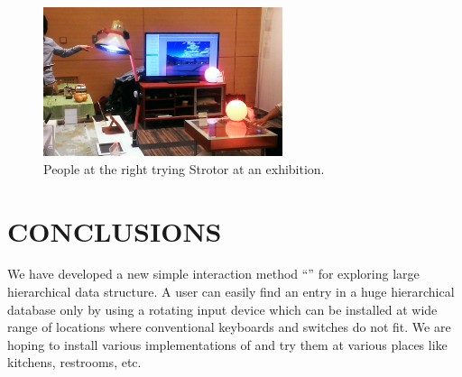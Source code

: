 \documentclass{article}
\begin{document}
\begin{figure}[H]
\centerline{\includegraphics[width=70mm,bb=0 0 527 329]{figures/c520d5dfbd06c532d48d324a7019b00c.png}}
\caption{People at the right trying Strotor at an exhibition.}
\label{exhibition}
\end{figure}


\section*{CONCLUSIONS}

We have developed a new simple interaction method ``{\ST}'' for exploring
large hierarchical data structure.
A {\ST} user can easily find an entry in a huge hierarchical database
only by using a rotating input device which can be installed at
wide range of locations where conventional keyboards and switches do not fit.
We are hoping to install various implementations of {\ST} and try them at
various places like kitchens, restrooms, etc.

\small{


}
\end{document}
